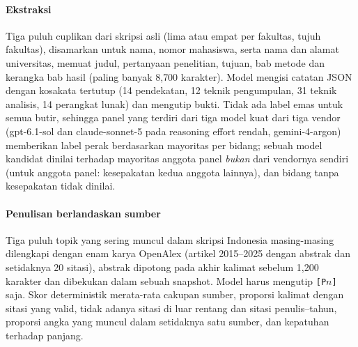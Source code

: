 \paragraph{Ekstraksi} Tiga puluh cuplikan dari skripsi asli (lima atau empat per fakultas, tujuh fakultas), disamarkan untuk nama, nomor mahasiswa, serta nama dan alamat universitas, memuat judul, pertanyaan penelitian, tujuan, bab metode dan kerangka bab hasil (paling banyak 8{,}700 karakter). Model mengisi catatan JSON dengan kosakata tertutup (14 pendekatan, 12 teknik pengumpulan, 31 teknik analisis, 14 perangkat lunak) dan mengutip bukti. Tidak ada label emas untuk semua butir, sehingga panel yang terdiri dari tiga model kuat dari tiga vendor (gpt-6.1-sol dan claude-sonnet-5 pada reasoning effort rendah, gemini-4-argon) memberikan label perak berdasarkan mayoritas per bidang; sebuah model kandidat dinilai terhadap mayoritas anggota panel \emph{bukan} dari vendornya sendiri (untuk anggota panel: kesepakatan kedua anggota lainnya), dan bidang tanpa kesepakatan tidak dinilai.

\paragraph{Penulisan berlandaskan sumber} Tiga puluh topik yang sering muncul dalam skripsi Indonesia masing-masing dilengkapi dengan enam karya OpenAlex (artikel 2015--2025 dengan abstrak dan setidaknya 20 sitasi), abstrak dipotong pada akhir kalimat sebelum 1{,}200 karakter dan dibekukan dalam sebuah snapshot. Model harus mengutip \texttt{[P$n$]} saja. Skor deterministik merata-rata cakupan sumber, proporsi kalimat dengan sitasi yang valid, tidak adanya sitasi di luar rentang dan sitasi penulis--tahun, proporsi angka yang muncul dalam setidaknya satu sumber, dan kepatuhan terhadap panjang.

